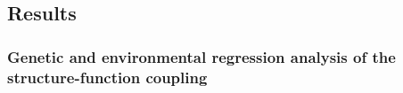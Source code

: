 \documentclass[12pt]{article}
\newcommand{\argmin}{\operatorname*{arg \ min}}
\DeclareMathOperator{\G}{\mathbf{G}}
\DeclareMathOperator{\E}{\mathbf{E}}
\DeclareMathOperator{\bSigma}{\mathbf{\Sigma}}
\DeclareMathOperator{\diag}{diag}
\begin{document}




\subsection{Results} \label{subsec:datanalaysisresults}

\subsubsection{Genetic and environmental regression analysis of the structure-function coupling}
\end{document}
